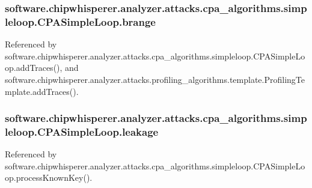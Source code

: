 \subsubsection[{brange}]{\setlength{\rightskip}{0pt plus 5cm}software.\+chipwhisperer.\+analyzer.\+attacks.\+cpa\+\_\+algorithms.\+simpleloop.\+C\+P\+A\+Simple\+Loop.\+brange}\label{classsoftware_1_1chipwhisperer_1_1analyzer_1_1attacks_1_1cpa__algorithms_1_1simpleloop_1_1CPASimpleLoop_adcb6a59548d927dba0feb6d0d84445e1}


Referenced by software.\+chipwhisperer.\+analyzer.\+attacks.\+cpa\+\_\+algorithms.\+simpleloop.\+C\+P\+A\+Simple\+Loop.\+add\+Traces(), and software.\+chipwhisperer.\+analyzer.\+attacks.\+profiling\+\_\+algorithms.\+template.\+Profiling\+Template.\+add\+Traces().

\hypertarget{classsoftware_1_1chipwhisperer_1_1analyzer_1_1attacks_1_1cpa__algorithms_1_1simpleloop_1_1CPASimpleLoop_aa7ac632a02f1219d1f023863a40ac29a}{}
\subsubsection[{leakage}]{\setlength{\rightskip}{0pt plus 5cm}software.\+chipwhisperer.\+analyzer.\+attacks.\+cpa\+\_\+algorithms.\+simpleloop.\+C\+P\+A\+Simple\+Loop.\+leakage}\label{classsoftware_1_1chipwhisperer_1_1analyzer_1_1attacks_1_1cpa__algorithms_1_1simpleloop_1_1CPASimpleLoop_aa7ac632a02f1219d1f023863a40ac29a}


Referenced by software.\+chipwhisperer.\+analyzer.\+attacks.\+cpa\+\_\+algorithms.\+simpleloop.\+C\+P\+A\+Simple\+Loop.\+process\+Known\+Key().

\hypertarget{classsoftware_1_1chipwhisperer_1_1analyzer_1_1attacks_1_1cpa__algorithms_1_1simpleloop_1_1CPASimpleLoop_a450751e7ecb40c5131d3ccf548ccddcb}{}
